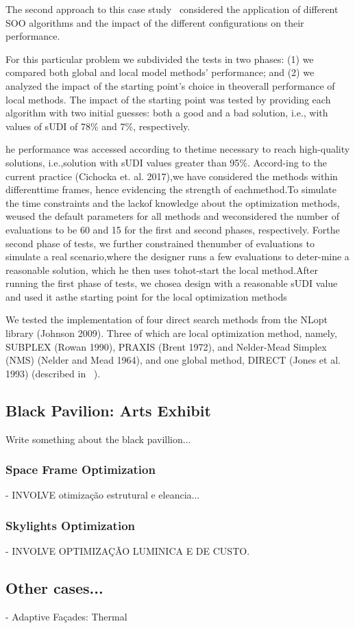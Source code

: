 The second approach to this case study~\cite{Belem2018optimizeddesign} considered the application of different \ac{SOO} algorithms and the impact of the different configurations on their performance.

For this particular problem we subdivided the tests in two phases: (1) we compared both global and local model methods’ performance; and (2) we analyzed the impact of the starting point’s choice in theoverall performance of local methods. The impact of the starting point was tested by providing each algorithm with two initial guesses: both a good and a bad solution, i.e., with values of sUDI of 78\% and 7\%, respectively. 


he performance was accessed according to thetime necessary to reach high-quality solutions, i.e.,solution with sUDI values greater than 95\%. Accord-ing to the current practice (Cichocka et.  al.  2017),we have considered the methods within differenttime frames, hence evidencing the strength of eachmethod.To simulate the time constraints and the lackof knowledge about the optimization methods, weused the default parameters for all methods and weconsidered the number of evaluations to be 60 and 15 for the first and second phases, respectively. Forthe second phase of tests, we further constrained thenumber of evaluations to simulate a real scenario,where the designer runs a few evaluations to deter-mine a reasonable solution, which he then uses tohot-start the local method.After running the first phase of tests, we chosea design with a reasonable sUDI value and used it asthe starting point for the local optimization methods

We tested the implementation of four direct search methods from the NLopt library (Johnson 2009). Three of which are local optimization method, namely, SUBPLEX (Rowan 1990), PRAXIS (Brent 1972), and Nelder-Mead Simplex (NMS) (Nelder and Mead 1964), and one global method, DIRECT (Jones et al. 1993) (described in ~).


\subsection{Black Pavilion: Arts Exhibit}

Write something about the black pavillion...

\subsubsection{Space Frame Optimization}

- INVOLVE otimização estrutural e eleancia...

\subsubsection{Skylights Optimization}

- INVOLVE OPTIMIZAÇÃO LUMINICA E DE CUSTO.


\subsection{Other cases...}

- Adaptive Façades: Thermal